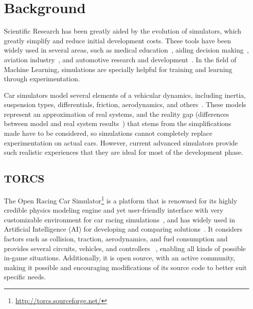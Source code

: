 \section{Background} \label{sec:2}

Scientific Research has been greatly aided by the evolution of simulators, which greatly simplify and reduce initial development costs. These tools have been widely used in several areas, such as medical education~\cite{MEDIC}, aiding decision making~\cite{useOfSimulaton2002}, aviation industry~\cite{AIR}, and automotive research and development~\cite{AUTR}. In the field of Machine Learning, simulations are specially helpful for training and learning through experimentation.

Car simulators model several elements of a vehicular dynamics, including inertia, suspension types, differentials, friction, aerodynamics, and others~\cite{SIMUTORCS}. These models represent an approximation of real systems, and the reality gap (differences between model and real system results~\cite{brookes2012authentic}) that stems from the simplifications made have to be considered, so simulations cannot completely replace experimentation on actual cars. However, current advanced simulators provide such realistic experiences that they are ideal for most of the development phase.

\subsection{TORCS}
The Open Racing Car Simulator\footnote{\url{http://torcs.sourceforge.net/}} is a platform that is renowned for its highly credible physics modeling engine and yet user-friendly interface with very customizable environment for car racing simulations~\cite{SIMUTORCS,SCR}, and has widely used in Artificial Intelligence (AI) for developing and comparing solutions~\cite{2009}. It considers factors such as collision, traction, aerodynamics, and fuel consumption and provides several circuits, vehicles, and controllers ~\cite{2009,Loiacono:2012:LEA:2212908.2212953}, enabling all kinds of possible in-game situations. Additionally, it is open source, with an active community, making it possible and encouraging modifications of its source code to better suit specific needs.


